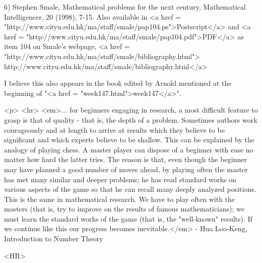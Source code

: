 6) Stephen Smale, Mathematical problems for the next century,
Mathematical Intelligencer, 20 (1998), 7-15.  Also available 
in 
<a href = "http://www.cityu.edu.hk/ma/staff/smale/pap104.ps">Postscript</a>
and 
<a href = "http://www.cityu.edu.hk/ma/staff/smale/pap104.pdf">PDF</a> 
as item 104 on Smale's webpage,
<a href = "http://www.cityu.edu.hk/ma/staff/smale/bibliography.html">
http://www.cityu.edu.hk/ma/staff/smale/bibliography.html</a>

I believe this also appears in the book edited by Arnold mentioned
at the beginning of "<a href = "week147.html">week147</a>".



<p> <hr>
<em>... for beginners engaging in research, a most difficult
feature to grasp is that of quality - that is, the depth of a
problem.  Sometimes authors work courageously and at length to
arrive at results which they believe to be significant and which
experts believe to be shallow. This can be explained by the analogy
of playing chess.  A master player can dispose of a beginner with
ease no matter how hard the latter tries.  The reason is that, even
though the beginner may have planned a good number of moves ahead, by
playing often the master has met many similar and deeper problems;
he has read standard works on various aspects of the game so that
he can recall many deeply analyzed positions.  This is the same in
mathematical research.  We have to play often with the masters
(that is, try to improve on the results of famous mathematicians);
we must learn the standard works of the game (that is, the "well-known"
results).  If we continue like this our progress becomes inevitable.</em> -
Hua Loo-Keng, Introduction to Number Theory

<HR>



